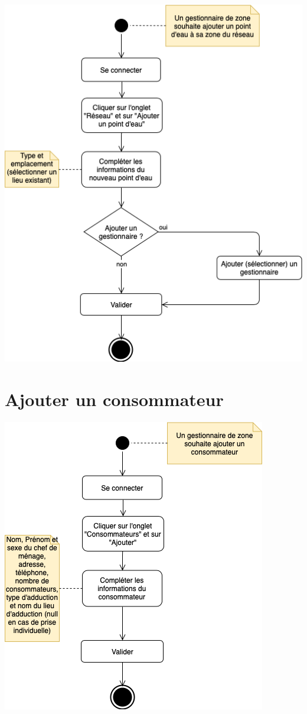\documentclass{EPL-master-thesis-covers-FR}
\begin{document}
			\begin{center}
				\includegraphics[scale=.5]{images/activity_fountain}
			\end{center}

		\section*{Ajouter un consommateur}

			\begin{center}
				\includegraphics[scale=.5]{images/activity_consumer}
			\end{center}
\end{document}
